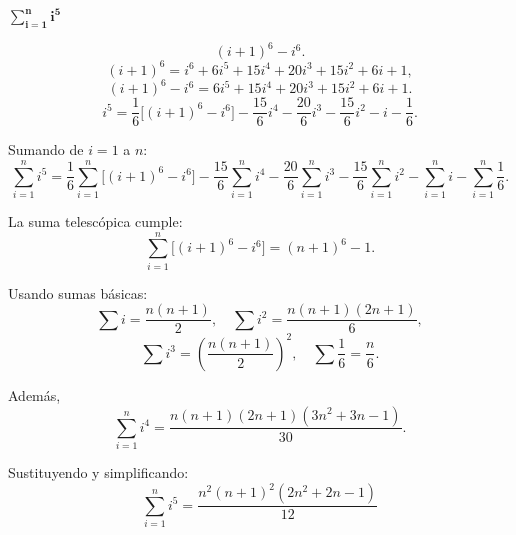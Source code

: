 $\displaystyle \mathbf{\sum_{i=1}^{n} i^5}$ 
\nopagebreak

\[
(i+1)^6 - i^6.
\]
\[
(i+1)^6
= i^6 + 6i^5 + 15i^4 + 20i^3 + 15i^2 + 6i + 1,
\]
\[
(i+1)^6 - i^6
= 6i^5 + 15i^4 + 20i^3 + 15i^2 + 6i + 1.
\]
\[
i^5
= \frac{1}{6}\big[(i+1)^6 - i^6\big]
- \frac{15}{6}i^4
- \frac{20}{6}i^3
- \frac{15}{6}i^2
- i
- \frac{1}{6}.
\]

Sumando de \(i=1\) a \(n\):
\[
\sum_{i=1}^{n} i^5
=
\frac{1}{6}\sum_{i=1}^{n}\big[(i+1)^6 - i^6\big]
-\frac{15}{6}\sum_{i=1}^{n} i^4
-\frac{20}{6}\sum_{i=1}^{n} i^3
-\frac{15}{6}\sum_{i=1}^{n} i^2
-\sum_{i=1}^{n} i
-\sum_{i=1}^{n} \frac{1}{6}.
\]

La suma telescópica cumple:
\[
\sum_{i=1}^{n}\big[(i+1)^6 - i^6\big] = (n+1)^6 - 1.
\]

Usando sumas básicas:
\[
\sum i = \frac{n(n+1)}{2}, \quad
\sum i^2 = \frac{n(n+1)(2n+1)}{6},
\]
\[
\sum i^3 = \left(\frac{n(n+1)}{2}\right)^2, \quad
\sum \frac{1}{6} = \frac{n}{6}.
\]

Además,
\[
\sum_{i=1}^{n} i^4
= \frac{n(n+1)(2n+1)(3n^2+3n-1)}{30}.
\]

Sustituyendo y simplificando:
\[
\boxed{
\sum_{i=1}^{n} i^5
=
\frac{n^2 (n+1)^2 (2n^2+2n-1)}{12}
}
\]

